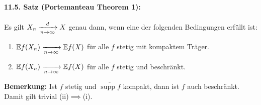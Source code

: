 \paragraph{11.5. Satz (Portemanteau Theorem 1):} Es gilt $X_n\nto{d}{n\to\infty}X$ genau dann, wenn eine der folgenden Bedingungen erf\"ullt ist:
\begin{enumerate}[label=(\roman*)]
    \item $\E f(X_n)\nto{}{n\to\infty}\E f(X)$ f\"ur alle $f$ stetig mit kompaktem Tr\"ager.
    \item $\E f(X_n)\nto{}{n\to\infty}\E f(X)$ f\"ur alle $f$ stetig und beschr\"ankt.
\end{enumerate}

\textbf{Bemerkung:} Ist $f$ stetig und $\overline{\operatorname{supp}f}$ kompakt, dann ist $f$ auch beschr\"ankt. Damit gilt trivial (ii)$\implies $(i).

